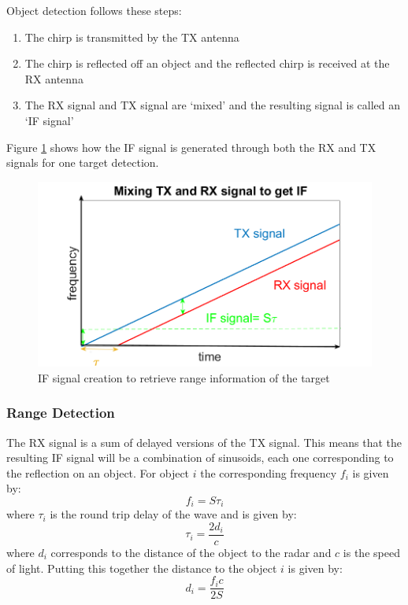 

Object detection follows these steps:
\begin{enumerate}
    \item The chirp is transmitted by the TX antenna
    \item The chirp is reflected off an object and the reflected chirp is received at the RX antenna
    \item The RX signal and TX signal are ‘mixed’ and the resulting signal is called an ‘\ac{IF} signal’
\end{enumerate}
Figure \ref{fig:if} shows how the IF signal is generated through both the RX and TX signals for one target detection.
\begin{figure}[ht] 
\centerline{\includegraphics [width=0.8 \textwidth]{imgs/chapter2/IFsignal.png}}
\caption{IF signal creation to retrieve range information of the target}
\label{fig:if}
\end{figure}

\subsubsection{Range Detection}
The RX signal is a sum of delayed versions of the TX signal. This means that the resulting \ac{IF} signal will be a combination of sinusoids, each one corresponding to the reflection on an object. For object $i$ the corresponding frequency $f_i$ is given by:
\begin{equation}
    f_i=S\tau_i
\end{equation}
where $\tau_i$ is the round trip delay of the wave and is given by:
\begin{equation}
    \tau_i=\frac{2d_i}{c}
\end{equation}
where $d_i$ corresponds to the distance of the object to the radar and $c$ is the speed of light.
Putting this together the distance to the object $i$ is given by:
\begin{equation}
    d_i=\frac{f_ic}{2S}
    \label{eq:1}
\end{equation}


